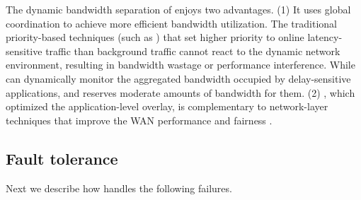 
The dynamic bandwidth separation of \name enjoys two advantages. (1) It uses global coordination to achieve more efficient bandwidth utilization. The traditional priority-based techniques (such as \cite{kumar2015bwe}) that set higher priority to online latency-sensitive traffic than background traffic cannot react to the dynamic network environment, resulting in bandwidth wastage or performance interference. While \name can dynamically monitor the aggregated bandwidth occupied by delay-sensitive applications, and reserves moderate amounts of bandwidth for them.
(2) \name, which optimized the application-level overlay, is complementary to network-layer techniques that improve the WAN performance and fairness \cite{chen2012design, kavulya2010analysis, mishra2010towards, reiss2012heterogeneity}.




\subsection{Fault tolerance}
\label{subsec:system:fault}
Next we describe how \name handles the following failures.

